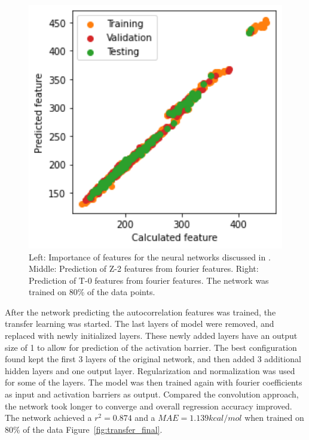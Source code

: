 \begin{figure}[h]
      \includegraphics[width=1.0\textwidth]{figures/regression/fourier/transfer/scatterT0.png}
    \endminipage
    \caption[Prediction of autocorrelation features from LEFD]{
    Left: Importance of features for the neural networks discussed in \cite{friederich_dos}.
    Middle: Prediction of Z-2 features from fourier features.
    Right: Prediction of T-0 features from fourier features. 
    The network was trained on 80\% of the data points.
    }
    \label{fig:transfer_result}
\end{figure}

After the network predicting the autocorrelation features was trained, the transfer learning was started.
The last layers of model were removed, and replaced with newly initialized layers.
These newly added layers have an output size of 1 to allow for prediction of the activation barrier.
The best configuration found kept the first 3 layers of the original network, and then added 3 additional hidden layers and one output layer.
Regularization and normalization was used for some of the layers.
The model was then trained again with fourier coefficients as input and activation barriers as output.
Compared the convolution approach, the network took longer to converge and overall regression accuracy improved.
The network achieved a $r^2=0.874$ and a $MAE=1.139 kcal/mol$ when trained on 80\% of the data Figure~\ref{fig:transfer_final}.


